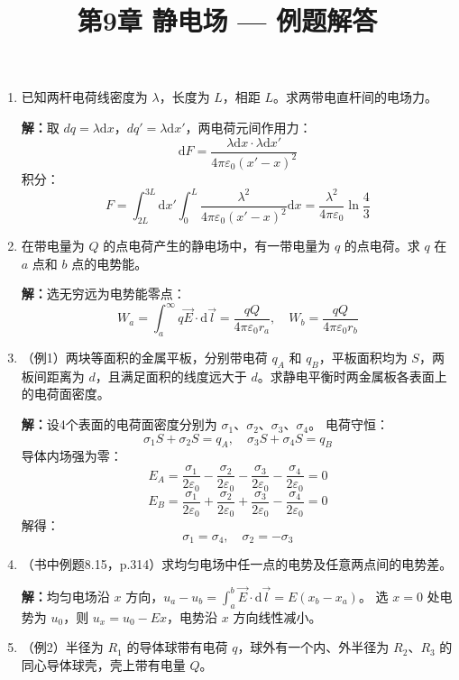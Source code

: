 \documentclass{ctexart}
\title{\textbf{第9章 静电场} --- 例题解答}
\author{}
\date{}
\begin{document}
\maketitle

\begin{enumerate}

\item 已知两杆电荷线密度为 $\lambda$，长度为 $L$，相距 $L$。求两带电直杆间的电场力。

\textbf{解：}取 $dq = \lambda\mathrm{d}x$，$dq' = \lambda\mathrm{d}x'$，两电荷元间作用力：
\[
\mathrm{d}F = \frac{\lambda\mathrm{d}x \cdot \lambda\mathrm{d}x'}{4\pi\varepsilon_0 (x' - x)^{2}}
\]
积分：
\[
F = \int_{2L}^{3L}\mathrm{d}x'\int_{0}^{L}\frac{\lambda^{2}}{4\pi\varepsilon_0 (x' - x)^{2}}\mathrm{d}x
= \frac{\lambda^{2}}{4\pi\varepsilon_0}\ln\frac{4}{3}
\]

\item 在带电量为 $Q$ 的点电荷产生的静电场中，有一带电量为 $q$ 的点电荷。求 $q$ 在 $a$ 点和 $b$ 点的电势能。

\textbf{解：}选无穷远为电势能零点：
\[
W_a = \int_a^{\infty} q\vec{E}\cdot\mathrm{d}\vec{l} = \frac{qQ}{4\pi\varepsilon_0 r_a},\quad
W_b = \frac{qQ}{4\pi\varepsilon_0 r_b}
\]

\item（例1）两块等面积的金属平板，分别带电荷 $q_A$ 和 $q_B$，平板面积均为 $S$，两板间距离为 $d$，且满足面积的线度远大于 $d$。求静电平衡时两金属板各表面上的电荷面密度。

\textbf{解：}设4个表面的电荷面密度分别为 $\sigma_1$、$\sigma_2$、$\sigma_3$、$\sigma_4$。
电荷守恒：
\[
\sigma_1 S + \sigma_2 S = q_A,\quad \sigma_3 S + \sigma_4 S = q_B
\]
导体内场强为零：
\[
E_A = \frac{\sigma_1}{2\varepsilon_0} - \frac{\sigma_2}{2\varepsilon_0} - \frac{\sigma_3}{2\varepsilon_0} - \frac{\sigma_4}{2\varepsilon_0} = 0
\]
\[
E_B = \frac{\sigma_1}{2\varepsilon_0} + \frac{\sigma_2}{2\varepsilon_0} + \frac{\sigma_3}{2\varepsilon_0} - \frac{\sigma_4}{2\varepsilon_0} = 0
\]
解得：
\[
\sigma_1 = \sigma_4,\quad \sigma_2 = -\sigma_3
\]

\item（书中例题8.15，p.314）求均匀电场中任一点的电势及任意两点间的电势差。

\textbf{解：}均匀电场沿 $x$ 方向，$u_a - u_b = \displaystyle\int_a^b \vec{E}\cdot\mathrm{d}\vec{l} = E(x_b - x_a)$。
选 $x = 0$ 处电势为 $u_0$，则 $u_x = u_0 - Ex$，电势沿 $x$ 方向线性减小。

\item（例2）半径为 $R_1$ 的导体球带有电荷 $q$，球外有一个内、外半径为 $R_2$、$R_3$ 的同心导体球壳，壳上带有电量 $Q$。


\end{enumerate}
\end{document}
